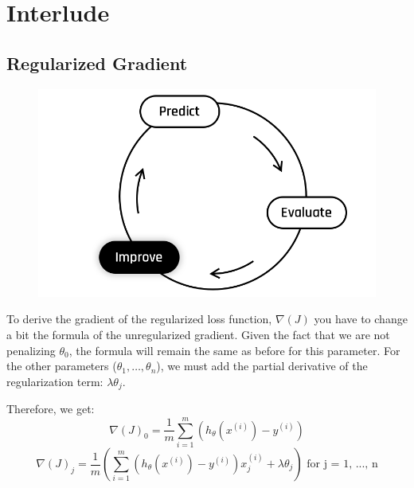 
\section*{Interlude}
\subsection*{Regularized Gradient}
\begin{figure}[!h]
    \centering
    \includegraphics[scale=0.25]{assets/Improve.png}
\end{figure}

To derive the gradient of the regularized loss function, $\nabla(J)$ you have to change a bit the formula of the unregularized gradient.  
Given the fact that we are not penalizing $\theta_0$, the formula will remain the same as before for this parameter. For the other parameters ($\theta_1, \dots, \theta_n$), we must add the partial derivative of the regularization term: $\lambda \theta_j$.

Therefore, we get:
$$
\nabla(J)_0 = \frac{1}{m}\sum_{i=1}^{m}(h_\theta(x^{(i)}) - y^{(i)})
$$
$$
\nabla(J)_j = \frac{1}{m}\left(\sum_{i=1}^{m}(h_\theta(x^{(i)}) - y^{(i)})x_j^{(i)} + \lambda \theta_j\right) \text{ for j = 1, ..., n}
$$

